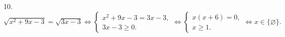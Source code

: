 10. $\sqrt{x^2+9x-3}=\sqrt{3x-3}\Leftrightarrow\begin{cases} x^2+9x-3=3x-3,\\ 3x-3\geqslant0.\end{cases}
\Leftrightarrow\begin{cases} x(x+6)=0,\\ x\geqslant1.\end{cases}\Leftrightarrow x\in\{\varnothing\}.$\\
